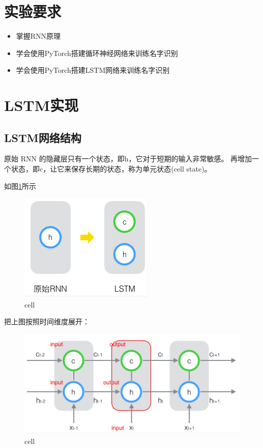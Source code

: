\documentclass[UTF8,a4paper,10pt]{ctexart}
\begin{document}
\section{实验要求}

\begin{itemize}
    \item 掌握RNN原理
    \item 学会使用PyTorch搭建循环神经网络来训练名字识别
    \item 学会使用PyTorch搭建LSTM网络来训练名字识别
\end{itemize}



\section{LSTM实现}

\subsection{LSTM网络结构}
原始 RNN 的隐藏层只有一个状态，即h，它对于短期的输入非常敏感。
再增加一个状态，即c，让它来保存长期的状态，称为单元状态(cell state)。

如图\ref{fig:1}所示
\begin{figure}[H]
    \centering
    \includegraphics[scale=1]{1.png}
    \caption{cell}
    \label{fig:1}
\end{figure}

把上图按照时间维度展开：

\begin{figure}[H]
    \centering
    \includegraphics[scale=1]{2.png}
    \caption{cell}
\end{figure}
\end{document}
